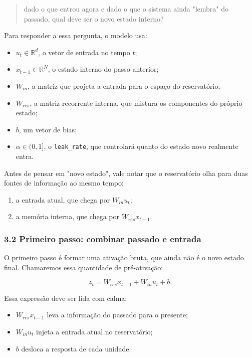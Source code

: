 \documentclass[12pt]{article}
\providecommand{\tightlist}{%
          \setlength{\itemsep}{0pt}\setlength{\parskip}{0pt}}
\begin{document}
\begin{quote}
dado o que entrou agora e dado o que o sistema ainda "lembra" do passado, qual deve ser o novo estado interno?
\end{quote}

Para responder a essa pergunta, o modelo usa:

\begin{itemize}
\tightlist
\item
  \(u_t \in \mathbb{R}^d\), o vetor de entrada no tempo \(t\);
\item
  \(x_{t-1} \in \mathbb{R}^N\), o estado interno do passo anterior;
\item
  \(W_{in}\), a matriz que projeta a entrada para o espaço do reservatório;
\item
  \(W_{res}\), a matriz recorrente interna, que mistura os componentes do próprio estado;
\item
  \(b\), um vetor de bias;
\item
  \(\alpha \in (0,1]\), o \texttt{leak\_rate}, que controlará quanto do estado novo realmente entra.
\end{itemize}

Antes de pensar em "novo estado", vale notar que o reservatório olha para duas fontes de informação ao mesmo tempo:

\begin{enumerate}
\def\labelenumi{\arabic{enumi}.}
\tightlist
\item
  a entrada atual, que chega por \(W_{in} u_t\);
\item
  a memória interna, que chega por \(W_{res} x_{t-1}\).
\end{enumerate}

\subsubsection{3.2 Primeiro passo: combinar passado e entrada}\label{32-primeiro-passo-combinar-passado-e-entrada}

O primeiro passo é formar uma ativação bruta, que ainda não é o novo estado final. Chamaremos essa quantidade de pré-ativação:

\[
z_t = W_{res} x_{t-1} + W_{in} u_t + b.
\]

Essa expressão deve ser lida com calma:

\begin{itemize}
\tightlist
\item
  \(W_{res} x_{t-1}\) leva a informação do passado para o presente;
\item
  \(W_{in} u_t\) injeta a entrada atual no reservatório;
\item
  \(b\) desloca a resposta de cada unidade.
\end{itemize}
\end{document}
